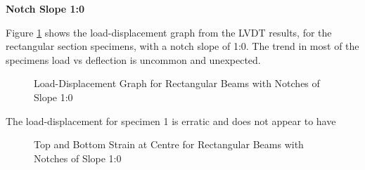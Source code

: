 \documentclass[11pt,a4paper]{article}
\numberwithin{equation}{subsection}
\begin{document}
\noindent
\textbf{Notch Slope 1:0}\par
\noindent
Figure \ref{fig:Rect_10_def} shows the load-displacement graph from the LVDT results, for the rectangular section specimens, with a notch slope of 1:0. The trend in most of the specimens load vs deflection is uncommon and unexpected.
\begin{figure}[h]
	\begin{center}
	\end{center}
	\caption{Load-Displacement Graph for Rectangular Beams with Notches of Slope 1:0}
	\label{fig:Rect_10_def}
\end{figure}

\noindent
The load-displacement for specimen 1 is erratic and does not appear to have 

\begin{figure}[h]
	\begin{center}
	\end{center}
	\caption{Top and Bottom Strain at Centre for Rectangular Beams with Notches of Slope 1:0}
	\label{fig:Rect_10_centre}
\end{figure}
\end{document}
